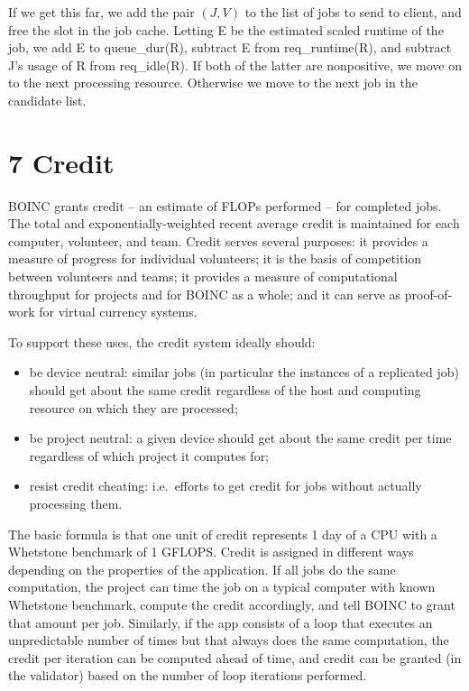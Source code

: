 \documentclass[
]{article}
\providecommand{\tightlist}{%
  \setlength{\itemsep}{0pt}\setlength{\parskip}{0pt}}
\begin{document}
If we get this far, we add the pair \((J, V)\) to the list of jobs to
send to client, and free the slot in the job cache. Letting E be the
estimated scaled runtime of the job, we add E to queue\_dur(R), subtract
E from req\_runtime(R), and subtract J's usage of R from req\_idle(R).
If both of the latter are nonpositive, we move on to the next processing
resource. Otherwise we move to the next job in the candidate list.

\section{7 Credit}\label{credit}

BOINC grants credit -- an estimate of FLOPs performed -- for completed
jobs. The total and exponentially-weighted recent average credit is
maintained for each computer, volunteer, and team. Credit serves several
purposes: it provides a measure of progress for individual volunteers;
it is the basis of competition between volunteers and teams; it provides
a measure of computational throughput for projects and for BOINC as a
whole; and it can serve as proof-of-work for virtual currency systems.

To support these uses, the credit system ideally should:

\begin{itemize}
\tightlist
\item
  be device neutral: similar jobs (in particular the instances of a
  replicated job) should get about the same credit regardless of the
  host and computing resource on which they are processed;\\
\item
  be project neutral: a given device should get about the same credit
  per time regardless of which project it computes for;\\
\item
  resist credit cheating: i.e.~efforts to get credit for jobs without
  actually processing them.
\end{itemize}

The basic formula is that one unit of credit represents 1 day of a CPU
with a Whetstone benchmark of 1 GFLOPS. Credit is assigned in different
ways depending on the properties of the application. If all jobs do the
same computation, the project can time the job on a typical computer
with known Whetstone benchmark, compute the credit accordingly, and tell
BOINC to grant that amount per job. Similarly, if the app consists of a
loop that executes an unpredictable number of times but that always does
the same computation, the credit per iteration can be computed ahead of
time, and credit can be granted (in the validator) based on the number
of loop iterations performed.
\end{document}
